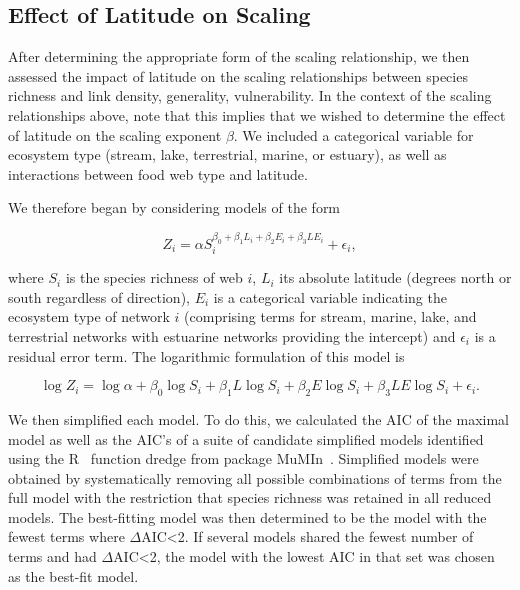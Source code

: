 \documentclass[12pt]{article}
\begin{document}
  \subsection*{Effect of Latitude on Scaling}


    After determining the appropriate form of the scaling relationship, we
    then assessed the impact of latitude on the scaling relationships between
    species richness and  link density, generality, vulnerability. In the
    context of the scaling relationships above, note  that this implies that
    we wished to determine the effect of latitude on the scaling exponent
    $\beta$. We included a categorical variable for
    ecosystem type (stream, lake,  terrestrial, marine, or estuary), as well
    as interactions between food web type and latitude.


    We therefore began by considering models of the form

    \begin{equation}
    \label{PowerLat}
    Z_{i}=\alpha S_{i}^{\beta_{0}+\beta_{1}L_{i}+\beta_{2}E_{i}+\beta_{3}LE_{i}} + \epsilon_{i} ,
    \end{equation}

    \noindent where $S_{i}$ is the species richness of web $i$, $L_{i}$ its absolute
    latitude (degrees north or south  regardless of direction), $E_{i}$ is a categorical
    variable indicating the ecosystem type of network $i$ (comprising terms for stream, 
    marine, lake, and terrestrial networks with estuarine
    networks providing the intercept) and $\epsilon_{i}$ is a residual error term.
    The logarithmic formulation of this model is

    \begin{equation}
    \label{LogLat}
    \log{Z_{i}} = \log{\alpha}+\beta_{0}\log{S_{i}} + \beta_{1}L\log{S_{i}} +\beta_{2}E\log{S_{i}} +\beta_{3}LE\log{S_{i}} +\epsilon_{i} .
    \end{equation}

    We then simplified each model. To do this, we calculated the AIC of the
    maximal model as well as the AIC's of a suite of candidate simplified
    models identified using the R~\citep{R} function dredge from package
    MuMIn~\citep{MuMIn}.  Simplified models were obtained by systematically
    removing all possible combinations  of terms from the full model with the
    restriction that species richness was retained in all reduced models. The
    best-fitting model was then determined to be the model with the fewest
    terms  where $\Delta$AIC\textless2. If several models shared the fewest
    number of terms  and had $\Delta$AIC\textless2, the model with the lowest
    AIC in that set was chosen as the best-fit model.
\end{document}
